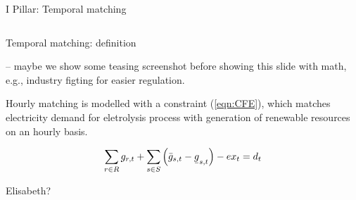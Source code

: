 \begin{frame}{I Pillar: Temporal matching}
\begin{columns}[t]
\begin{column}{0.5\textwidth}
	\end{column}
	\end{columns}
\end{frame}
\begin{frame}{Temporal matching: definition}

  -- maybe we show some teasing screenshot before showing this slide with math, e.g., industry figting for easier regulation.

  \alert{Hourly matching} is modelled with a constraint (\ref{eqn:CFE}), 
  which matches electricity demand for eletrolysis process with generation of renewable resources on an hourly basis. 

  \vspace{0.1cm}
  \begin{equation}
  \sum_{r\in R} g_{r,t} + \sum_{s\in S} \left(\bar{g}_{s,t} - \ubar{g}_{s,t}\right) - ex_t = d_t
  \label{eqn:CFE}
  \end{equation}
  \vspace{0.1cm}
  
  \noindent{}

  Elisabeth?

\end{frame}


